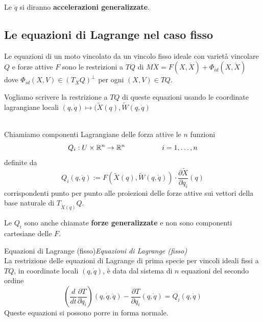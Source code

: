 \documentclass[11pt,a4paper,twoside]{book}
\newenvironment{proposizione}[1][\empty]{\begin{Proposizione}{
\ifx\empty#1\relax\else\mdseries\itshape#1\\\fi
}{}}{\end{Proposizione}}
\newenvironment{definizione}[1][\empty]{\begin{Definizione}{
\ifx\empty#1\relax\else\mdseries\itshape#1\\\fi
}{}}{\end{Definizione}}
\theoremstyle{esss}
\theoremstyle{dotless}
\numberwithin{equation}{section} %
\begin{document}
Le $\ddot{q}$ si diranno \textbf{accelerazioni generalizzate}.


\subsection{Le equazioni di Lagrange nel caso fisso}\label{sezLagrangeFisso}

Le equazioni di un moto vincolato da un vincolo fisso ideale con varietà vincolare $Q$ e forze attive $F$ sono le restrizioni a $TQ$ di
$M\ddot{X}=F(X,\dot{X})+\Phi_{id}(X,\dot{X})$ dove $\Phi_{id}(X,V)\in (T_XQ)^\perp$ per ogni $(X,V)\in TQ$.

Vogliamo scrivere la restrizione a $TQ$ di queste equazioni usando le coordinate lagrangiane locali $(q,\dot{q})\mapsto(\tilde{X}(q),\tilde{W}(q,\dot{q})$

\begin{definizione}
Chiamiamo componenti Lagrangiane delle forza attive le $n$ funzioni
\[
Q_i : U \times \mathbb{R}^n \rightarrow\mathbb{R}^n  \hspace{0.15\linewidth} i = 1, \dots , n 
\]
definite da
\[
Q_i(q,\dot{q}) := F\left(\tilde{X}(q),\tilde{W}(q,\dot{q})\right) \cdot \dfrac{\partial \tilde{X}}{\partial q_i}(q)
\]
corrispondenti punto per punto alle proiezioni delle forze attive sui vettori della base naturale di $T_{\tilde{X}(q)}Q$.
\end{definizione}

Le $Q_i$ sono anche chiamate \textbf{forze generalizzate} e non sono componenti cartesiane delle $F$.

\begin{proposizione}[Equazioni di Lagrange (fisso)]\label{propLagrangeFisso}
La restrizione delle equazioni di Lagrange di prima specie per vincoli ideali fissi a $TQ$, in coordinate locali $(q,\dot{q})$, è data dal sistema di $n$ equazioni del secondo ordine 
\begin{equation}\label{eqLagrangeFisso}
\left(\dfrac{d}{dt}\dfrac{\partial T}{\partial \dot{q}_i} \right) (q,\dot{q},\ddot{q}) - \dfrac{\partial T}{\partial q_i}(q,\dot{q})=Q_i(q,\dot{q})
\end{equation}
Queste equazioni si possono porre in forma normale.
\end{proposizione}
\end{document}
